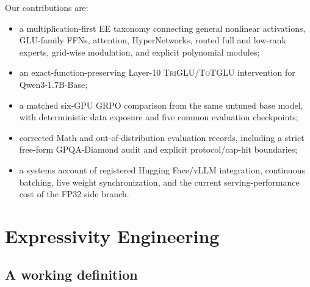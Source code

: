 \documentclass[10pt]{article}
\newcommand{\TriGLU}{\textsc{TriGLU}}
\newcommand{\ToTGLU}{\textsc{ToTGLU}}
\begin{document}
Our contributions are:

\begin{itemize}
  \item a multiplication-first EE taxonomy connecting general nonlinear
        activations, GLU-family FFNs, attention, HyperNetworks, routed full and
        low-rank experts, grid-wise modulation, and explicit polynomial
        modules;
  \item an exact-function-preserving Layer-10 \TriGLU{}/\ToTGLU{} intervention
        for Qwen3-1.7B-Base;
  \item a matched six-GPU GRPO comparison from the same untuned base model,
        with deterministic data exposure and five common evaluation
        checkpoints;
  \item corrected Math and out-of-distribution evaluation records, including a
        strict free-form GPQA-Diamond audit and explicit protocol/cap-hit
        boundaries;
  \item a systems account of registered Hugging Face/vLLM integration,
        continuous batching, live weight synchronization, and the current
        serving-performance cost of the FP32 side branch.
\end{itemize}

\section{Expressivity Engineering}

\subsection{A working definition}
\end{document}
